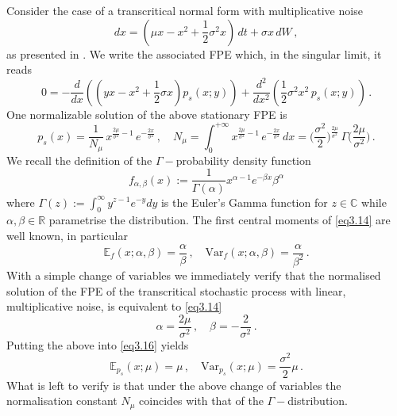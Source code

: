 \documentclass[../main.tex]{subfiles}
\begin{document}
\begin{example}[label=ex3.4]{}{}
Consider the case of a transcritical normal form with multiplicative noise
\begin{equation*}
         dx = (\mu x - x^{2} + \frac{1}{2}\sigma^{2}x)\,dt + \sigma x\,dW\,,
\end{equation*}
as presented in \cite{Kuehn11}. 
We write the associated FPE which, in the singular limit, it reads
\begin{equation*}
          0 = -\frac{d}{dx}((yx - x^{2} + \frac{1}{2}\sigma x)p_{s}(x; y)) + \frac{d^{2}}{dx^{2}}(\frac{1}{2}\sigma^{2}x^{2}\,p_{s}(x; y))\,.
\end{equation*}
One normalizable solution of the above stationary FPE is
\begin{equation*}
          p_{s}(x) = \frac{1}{N_{\mu}}\,x^{\frac{2\mu}{\sigma^{2}}-1}\,e^{-\frac{2x}{\sigma^{2}}}\,,\quad N_{\mu}=\int_{0}^{+\infty} x^{\frac{2\mu}{\sigma^{2}}-1}\,e^{-\frac{2x}{\sigma^{2}}}\,dx = \bigg(\frac{\sigma^{2}}{2}\bigg)^{\frac{2\mu}{\sigma^{2}}}\,\Gamma\bigg(\frac{2\mu}{\sigma^{2}}\bigg)\,.
\end{equation*}
We recall the definition of the $\Gamma-$probability density function
\begin{equation}\label{eq3.15}
     f_{\alpha,\beta}(x):=\frac{1}{\Gamma(\alpha)}x^{\alpha-1}e^{-\beta x}\beta^{\alpha}
\end{equation}
where $\Gamma(z):=\int_{0}^{\infty}y^{z-1}e^{-y}dy$ is the Euler's Gamma function for $z\in \mathbb{C}$ while $\alpha,\beta\in \mathbb{R}$ parametrise the distribution.
The first central moments of \eqref{eq3.14} are well known, in particular
\begin{equation}\label{eq3.16}
     \mathbb{E}_{f}(x;\alpha,\beta) = \frac{\alpha}{\beta}\,,\quad \text{Var}_{f}(x;\alpha,\beta)=\frac{\alpha}{\beta^{2}}\,.
\end{equation}
With a simple change of variables we immediately verify that the normalised solution of the FPE of the transcritical stochastic process with linear, multiplicative noise, is equivalent to \eqref{eq3.14}
\begin{equation*}
    \alpha = \frac{2\mu}{\sigma^{2}}\,,\quad \beta=-\frac{2}{\sigma^{2}}\,. 
\end{equation*}
Putting the above into \eqref{eq3.16} yields
\begin{equation*}
     \mathbb{E}_{p_{s}}(x;\mu)=\mu\,,\quad \text{Var}_{p_{s}}(x;\mu)=\frac{\sigma^{2}}{2}\mu\,.
\end{equation*}
What is left to verify is that under the above change of variables the normalisation constant $N_{\mu}$ coincides with that of the $\Gamma-$distribution.

\end{example}
\end{document}
